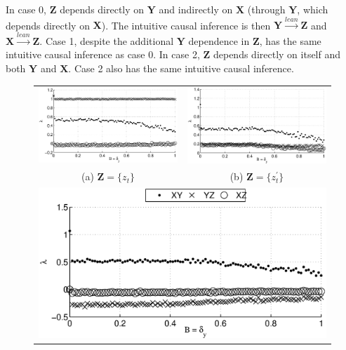 \documentclass[twocolumn,aps,pre,groupedaddress]{revtex4-1}
\begin{document}
In case 0, $\mathbf{Z}$ depends directly on $\mathbf{Y}$ and indirectly on $\mathbf{X}$ (through $\mathbf{Y}$, which depends directly on $\mathbf{X}$).  The intuitive causal inference is then $\mathbf{Y}\xrightarrow{lean}\mathbf{Z}$ and $\mathbf{X}\xrightarrow{lean}\mathbf{Z}$.  Case 1, despite the additional $\mathbf{Y}$ dependence in $\mathbf{Z}$, has the same intuitive causal inference as case 0.  In case 2, $\mathbf{Z}$ depends directly on itself and both $\mathbf{Y}$ and $\mathbf{X}$.  Case 2 also has the same intuitive causal inference.

\begin{figure}[ht]
\begin{tabular}{cc}
\includegraphics[scale=0.40]{XYZIRexample_Bxytol.eps} & \includegraphics[scale=0.40]{XYZIRexample_BxytolZXandY.eps} \\
(a) $\mathbf{Z} = \{z_t\}$ & (b) $\mathbf{Z} = \{z^\prime_t\}$ \\
\multicolumn{2}{c}{\includegraphics[scale=0.40]{XYZIRexample_BxytolZXandYandZ.eps}} \\

\end{tabular}
\end{figure}
\end{document}
